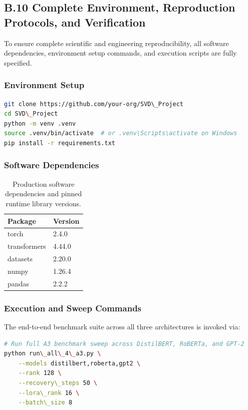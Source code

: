 \subsection{B.10 Complete Environment, Reproduction Protocols, and Verification}
\label{sec:app_full_reproduction}

To ensure complete scientific and engineering reproducibility, all software dependencies, environment setup commands, and execution scripts are fully specified.

\subsubsection{Environment Setup}

\begin{lstlisting}[language=bash]
git clone https://github.com/your-org/SVD\_Project
cd SVD\_Project
python -m venv .venv
source .venv/bin/activate  # or .venv\Scripts\activate on Windows
pip install -r requirements.txt
\end{lstlisting}

\subsubsection{Software Dependencies}

\begin{table}[H]
\centering
\small
\begin{tabular}{ll}
\toprule
\textbf{Package} & \textbf{Version} \\
\midrule
torch & 2.4.0 \\
transformers & 4.44.0 \\
datasets & 2.20.0 \\
numpy & 1.26.4 \\
pandas & 2.2.2 \\
\bottomrule
\end{tabular}
\caption{Production software dependencies and pinned runtime library versions.}
\label{tab:app_dependencies}
\end{table}

\subsubsection{Execution and Sweep Commands}

The end-to-end benchmark suite across all three architectures is invoked via:

\begin{lstlisting}[language=bash]
# Run full A3 benchmark sweep across DistilBERT, RoBERTa, and GPT-2
python run\_all\_4\_a3.py \
    --models distilbert,roberta,gpt2 \
    --rank 128 \
    --recovery\_steps 50 \
    --lora\_rank 16 \
    --batch\_size 8
\end{lstlisting}

